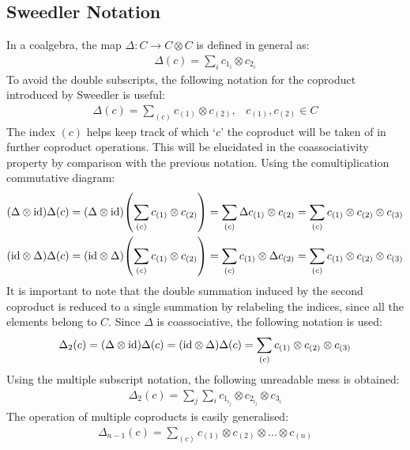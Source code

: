 \documentclass{article}
\theoremstyle{definition}
\theoremstyle{remark}
\theoremstyle{underline}
\theoremstyle{underline}
\newcommand{\id}{\mathrm{id}}
\begin{document}
	\subsection{Sweedler Notation}

	In a coalgebra, the map $\Delta \colon C \to C \otimes C$ is defined in general as:
	\begin{gather*}
		\Delta(c) = \sum_i c_{1_i} \otimes c_{2_i}	
	\end{gather*}
	To avoid the double subscripts, the following notation for the coproduct introduced by Sweedler is useful:
	\begin{gather*}
		\Delta(c) = \sum_{(c)} c_{(1)} \otimes c_{(2)}, \;\;\; c_{(1)}, c_{(2)} \in C
	\end{gather*}
	The index $(c)$ helps keep track of which `$c$' the coproduct will be taken of in further coproduct operations. This will be elucidated in the coassociativity property by comparison with the previous notation. Using the comultiplication commutative diagram:
	\begin{gather*}
		\pqty{\Delta \otimes \id}\Delta(c) = \pqty{\Delta \otimes \id}\pqty{\sum_{(c)} c_{(1)} \otimes c_{(2)}} = \sum_{(c)} \Delta c_{(1)} \otimes c_{(2)} = \sum_{(c)} c_{(1)} \otimes c_{(2)} \otimes c_{(3)} \\
		\pqty{\id \otimes \Delta}\Delta(c) = \pqty{\id \otimes \Delta}\pqty{\sum_{(c)} c_{(1)} \otimes c_{(2)}} = \sum_{(c)} c_{(1)} \otimes \Delta c_{(2)} = \sum_{(c)} c_{(1)} \otimes c_{(2)} \otimes c_{(3)}
	\end{gather*}
	It is important to note that the double summation induced by the second coproduct is reduced to a single summation by relabeling the indices, since all the elements belong to $C$. Since $\Delta$ is coassociative, the following notation is used:
	\begin{gather*}
		\Delta_2(c) = \pqty{\Delta \otimes \id}\Delta(c) = \pqty{\id \otimes \Delta}\Delta(c) = \sum_{(c)} c_{(1)} \otimes c_{(2)} \otimes c_{(3)}
	\end{gather*}
	Using the multiple subscript notation, the following unreadable mess is obtained:
	\begin{gather*}
		\Delta_2(c) = \sum_j \sum_i c_{1_{i_j}} \otimes c_{2_{i_j}} \otimes c_{3_i}
	\end{gather*}
	The operation of multiple coproducts is easily generalised:
	\begin{gather*}
		\Delta_{n-1}(c) = \sum_{(c)} c_{(1)} \otimes c_{(2)} \otimes \dots \otimes c_{(n)} 
	\end{gather*}
\end{document}
